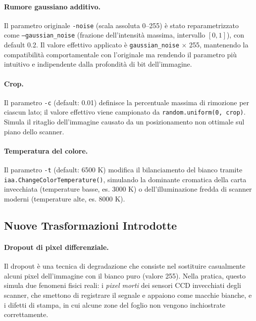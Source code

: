 \paragraph{Rumore gaussiano additivo.} Il parametro originale \texttt{-noise} (scala assoluta 0--255) è stato reparametrizzato come \texttt{--gaussian\_noise} (frazione dell'intensità massima, intervallo $[0,1]$), con default 0.2. Il valore effettivo applicato è \texttt{gaussian\_noise} $\times$ 255, mantenendo la compatibilità comportamentale con l'originale ma rendendo il parametro più intuitivo e indipendente dalla profondità di bit dell'immagine.

\paragraph{Crop.} Il parametro \texttt{-c} (default: 0.01) definisce la percentuale massima di rimozione per ciascun lato; il valore effettivo viene campionato da \texttt{random.uniform(0, crop)}. Simula il ritaglio dell'immagine causato da un posizionamento non ottimale sul piano dello scanner.

\paragraph{Temperatura del colore.} Il parametro \texttt{-t} (default: 6500 K) modifica il bilanciamento del bianco tramite \texttt{iaa.ChangeColorTemperature()}, simulando la dominante cromatica della carta invecchiata (temperature basse, es. 3000 K) o dell'illuminazione fredda di scanner moderni (temperature alte, es. 8000 K).

\subsection{Nuove Trasformazioni Introdotte}

\paragraph{Dropout di pixel differenziale.} Il dropout è una tecnica di degradazione che consiste nel sostituire casualmente alcuni pixel dell'immagine con il bianco puro (valore 255). Nella pratica, questo simula due fenomeni fisici reali: i \textit{pixel morti} dei sensori CCD invecchiati degli scanner, che smettono di registrare il segnale e appaiono come macchie bianche, e i difetti di stampa, in cui alcune zone del foglio non vengono inchiostrate correttamente.

